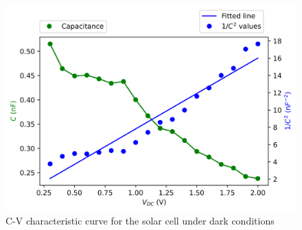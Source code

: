 \documentclass[%
 aip,
 amsmath,amssymb,
 reprint, floatfix%
]{revtex4-2}
\begin{document}
    \begin{figure}
        \centering
        \includegraphics[scale = 0.54]{Figures/plot-cv-dark.png}
        \caption{C-V characteristic curve for the solar cell under dark conditions}
        \label{fig:cv-dark}
    \end{figure}
\end{document}
